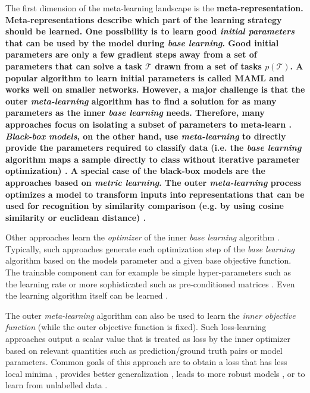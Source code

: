 The first dimension of the meta-learning landscape is the \bf{meta-representation}.
Meta-representations describe which part of the learning strategy should be learned.
One possibility is to learn good \emph{initial parameters} that can be used by the model during \emph{base learning}.
Good initial parameters are only a few gradient steps away from a set of parameters that can solve a task $\mathcal{T}$ drawn from a set of tasks $p(\mathcal{T})$.
A popular algorithm to learn initial parameters is called MAML  and works well on smaller networks.
However, a major challenge is that the outer \emph{meta-learning} algorithm has to find a solution for as many parameters as the inner \emph{base learning} needs.
Therefore, many approaches focus on isolating a subset of parameters to meta-learn \cite{lee2018gradient, qiao2018few, rusu2018meta}.
\emph{Black-box models}, on the other hand, use \emph{meta-learning} to directly provide the parameters required to classify data (i.e. the \emph{base learning} algorithm maps a sample directly to class without iterative parameter optimization) \cite{heskes2000empirical, 10-5555-3454287-3455002, Ha_Dai_Le_2016}.
A special case of the black-box models are the approaches based on \emph{metric learning}.
The outer \emph{meta-learning} process optimizes a model to transform inputs into representations that can be used for recognition by similarity comparison (e.g. by using cosine similarity or euclidean distance) \cite{10-5555-3294996-3295163, qiao2018few, Chen_Liu_Kira_Wang_Huang_2020}.

Other approaches learn the \emph{optimizer} of the inner \emph{base learning} algorithm \cite{ravi2016optimization, ravi2016optimization, Li_Malik_2016, Li_Zhou_Chen_Li_2017}.
Typically, such approaches generate each optimization step of the \emph{base learning} algorithm based on the models parameter and a given base objective function.
The trainable component can for example be simple hyper-parameters such as the learning rate \cite{Li_Zhou_Chen_Li_2017} or more sophisticated such as pre-conditioned matrices \cite{Park_Oliva_2020}.
Even the learning algorithm itself can be learned .

The outer \emph{meta-learning} algorithm can also be used to learn the \emph{inner objective function} (while the outer objective function is fixed).
Such loss-learning approaches output a scalar value that is treated as loss by the inner optimizer based on relevant quantities such as prediction/ground truth pairs or model parameters.
Common goals of this approach are to obtain a loss that has less local minima \cite{NEURIPS2018_7876acb6, Sung_Zhang_Xiang_Hospedales_Yang_2017}, provides better generalization \cite{NEURIPS2018_b9a25e42, NEURIPS2019_e0e2b58d, gonzalez2020improved}, leads to more robust models \cite{li2019feature}, or to learn from unlabelled data \cite{NEURIPS2019_6018df18, Boney2018SemiSupervisedFL}.

